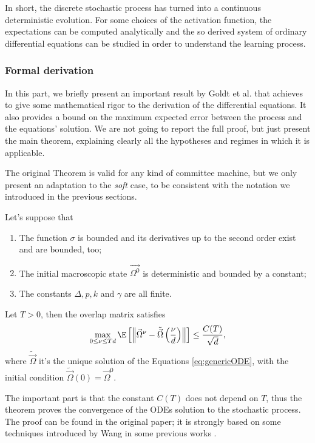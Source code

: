 In short, the discrete stochastic process has turned into a continuous deterministic evolution.
For some choices of the activation function, the expectations can be computed analytically and
the so derived system of ordinary differential equations can be studied in order
to understand the learning process.

\subsubsection{Formal derivation}
In this part, we briefly present an important result by Goldt et al.\cite{goldt2019dynamics}
that achieves to give some mathematical rigor to the derivation of the differential
equations. It also provides a bound on the maximum expected error between the process
and the equations' solution. We are not going to report the full proof, but just 
present the main theorem, explaining clearly all the hypotheses and regimes in which
it is applicable.

The original Theorem is valid for any kind of committee machine, but we only present
an adaptation to the \emph{soft} case, to be consistent with the notation
we introduced in the previous sections.
\begin{Theorem}\label{thm:process_to_ode_goldt}
  Let's suppose that
  \begin{enumerate}
    \item The function \(\sigma\) is bounded and its derivatives up to the second order exist and are bounded, too;
    \item The initial macroscopic state \(\vec{\Omega^0}\) is deterministic and bounded by a constant;
    \item The constants \(\Delta, p, k\) and \(\gamma\) are all finite.
  \end{enumerate}
  Let \(T>0\), then the overlap matrix satisfies 
  \begin{equation}
    \max_{0\le\nu\le Td} \E\left[
      \left\|\vec{\Omega}^\nu - \tilde{\vec{\Omega}}\left(\frac{\nu}{d}\right)\right\|
    \right]
    \le
    \frac{C{(T)}}{\sqrt{d}},
  \end{equation}
  where \(\tilde{\vec{\Omega}}\) it's the unique solution of the Equations \eqref{eq:genericODE},
  with the initial condition \(\tilde{\vec{\Omega}}{(0)} = \vec{\Omega}^0\). 
\end{Theorem}
The important part is that the constant \(C{(T)}\) does not depend on \(T\), thus 
the theorem proves the convergence of the ODEs solution to the stochastic process.
The proof can be found in the original paper\cite{goldt2019dynamics};
it is strongly based on some techniques introduced by Wang in some previous works
\cite{wang2017scaling,wang2019solvable}.

